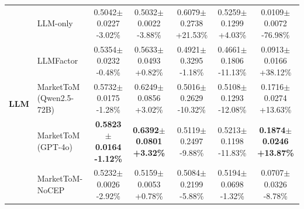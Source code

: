 \documentclass[a4paper,fleqn,doubleblind]{cas-sc}
\begin{document}
\begin{table}[!ht]
{\begin{tabular}{llccccc}
\midrule
\multirow{5}{*}{\textbf{LLM}} & LLM-only & \shortstack{0.5042$\pm$0.0227 \\ {\scriptsize -3.02\%}} & \shortstack{0.5032$\pm$0.0022 \\ {\scriptsize -3.88\%}} & \shortstack{0.6079$\pm$0.2738 \\ {\scriptsize +21.53\%}} & \shortstack{0.5259$\pm$0.1299 \\ {\scriptsize +4.03\%}} & \shortstack{0.0109$\pm$0.0072 \\ {\scriptsize -76.98\%}} \\
 & LLMFactor & \shortstack{0.5354$\pm$0.0232 \\ {\scriptsize -0.48\%}} & \shortstack{0.5633$\pm$0.0493 \\ {\scriptsize +0.82\%}} & \shortstack{0.4921$\pm$0.3295 \\ {\scriptsize -1.18\%}} & \shortstack{0.4661$\pm$0.1806 \\ {\scriptsize -11.13\%}} & \shortstack{0.0913$\pm$0.0166 \\ {\scriptsize +38.12\%}} \\
 & MarketToM (Qwen2.5-72B) & \shortstack{0.5732$\pm$0.0175 \\ {\scriptsize -1.28\%}} & \shortstack{0.6249$\pm$0.0856 \\ {\scriptsize +3.02\%}} & \shortstack{0.5016$\pm$0.2629 \\ {\scriptsize -10.32\%}} & \shortstack{0.5108$\pm$0.1293 \\ {\scriptsize -12.08\%}} & \shortstack{0.1716$\pm$0.0274 \\ {\scriptsize +13.63\%}} \\
 & MarketToM (GPT-4o) & \shortstack{\textbf{0.5823}$\pm$\textbf{0.0164} \\ {\scriptsize \textbf{-1.12\%}}} & \shortstack{\textbf{0.6392}$\pm$\textbf{0.0801} \\ {\scriptsize \textbf{+3.32\%}}} & \shortstack{0.5119$\pm$0.2497 \\ {\scriptsize -9.88\%}} & \shortstack{0.5213$\pm$0.1198 \\ {\scriptsize -11.83\%}} & \shortstack{\textbf{0.1874}$\pm$\textbf{0.0246} \\ {\scriptsize \textbf{+13.87\%}}} \\
 & MarketToM-NoCEP & \shortstack{0.5232$\pm$0.0026 \\ {\scriptsize -2.92\%}} & \shortstack{0.5159$\pm$0.0053 \\ {\scriptsize +0.78\%}} & \shortstack{0.5084$\pm$0.2199 \\ {\scriptsize -5.88\%}} & \shortstack{0.5194$\pm$0.0698 \\ {\scriptsize -1.32\%}} & \shortstack{0.0707$\pm$0.0326 \\ {\scriptsize -8.78\%}} \\
\bottomrule
\end{tabular}
}
\label{tab:stress_test_results}
\end{table}
\end{document}
